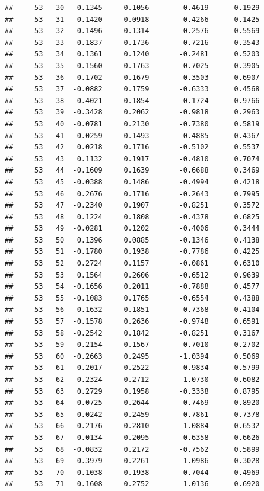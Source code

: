 \documentclass[
]{article}
\begin{document}
\begin{verbatim}
##     53   30  -0.1345     0.1056       -0.4619      0.1929  
##     53   31  -0.1420     0.0918       -0.4266      0.1425  
##     53   32   0.1496     0.1314       -0.2576      0.5569  
##     53   33  -0.1837     0.1736       -0.7216      0.3543  
##     53   34   0.1361     0.1240       -0.2481      0.5203  
##     53   35  -0.1560     0.1763       -0.7025      0.3905  
##     53   36   0.1702     0.1679       -0.3503      0.6907  
##     53   37  -0.0882     0.1759       -0.6333      0.4568  
##     53   38   0.4021     0.1854       -0.1724      0.9766  
##     53   39  -0.3428     0.2062       -0.9818      0.2963  
##     53   40  -0.0781     0.2130       -0.7380      0.5819  
##     53   41  -0.0259     0.1493       -0.4885      0.4367  
##     53   42   0.0218     0.1716       -0.5102      0.5537  
##     53   43   0.1132     0.1917       -0.4810      0.7074  
##     53   44  -0.1609     0.1639       -0.6688      0.3469  
##     53   45  -0.0388     0.1486       -0.4994      0.4218  
##     53   46   0.2676     0.1716       -0.2643      0.7995  
##     53   47  -0.2340     0.1907       -0.8251      0.3572  
##     53   48   0.1224     0.1808       -0.4378      0.6825  
##     53   49  -0.0281     0.1202       -0.4006      0.3444  
##     53   50   0.1396     0.0885       -0.1346      0.4138  
##     53   51  -0.1780     0.1938       -0.7786      0.4225  
##     53   52   0.2724     0.1157       -0.0861      0.6310  
##     53   53   0.1564     0.2606       -0.6512      0.9639  
##     53   54  -0.1656     0.2011       -0.7888      0.4577  
##     53   55  -0.1083     0.1765       -0.6554      0.4388  
##     53   56  -0.1632     0.1851       -0.7368      0.4104  
##     53   57  -0.1578     0.2636       -0.9748      0.6591  
##     53   58  -0.2542     0.1842       -0.8251      0.3167  
##     53   59  -0.2154     0.1567       -0.7010      0.2702  
##     53   60  -0.2663     0.2495       -1.0394      0.5069  
##     53   61  -0.2017     0.2522       -0.9834      0.5799  
##     53   62  -0.2324     0.2712       -1.0730      0.6082  
##     53   63   0.2729     0.1958       -0.3338      0.8795  
##     53   64   0.0725     0.2644       -0.7469      0.8920  
##     53   65  -0.0242     0.2459       -0.7861      0.7378  
##     53   66  -0.2176     0.2810       -1.0884      0.6532  
##     53   67   0.0134     0.2095       -0.6358      0.6626  
##     53   68  -0.0832     0.2172       -0.7562      0.5899  
##     53   69  -0.3979     0.2261       -1.0986      0.3028  
##     53   70  -0.1038     0.1938       -0.7044      0.4969  
##     53   71  -0.1608     0.2752       -1.0136      0.6920  

\end{verbatim}
\end{document}
